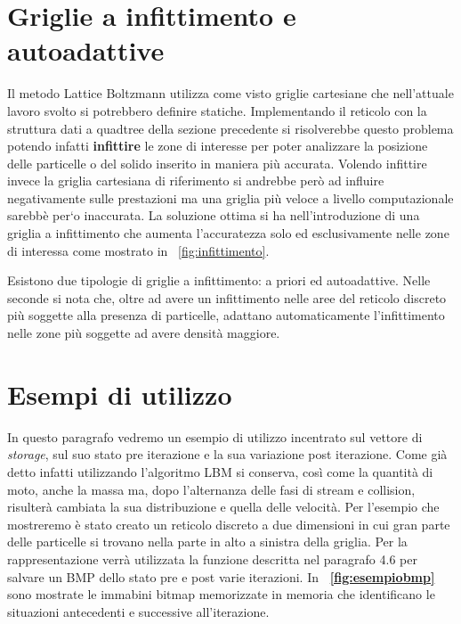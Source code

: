 \section{Griglie a infittimento e autoadattive}
Il metodo Lattice Boltzmann utilizza come visto griglie cartesiane che nell'attuale lavoro svolto si potrebbero definire statiche. Implementando il reticolo con la struttura dati a quadtree della sezione precedente si risolverebbe questo problema potendo infatti \textbf{infittire} le zone di interesse per poter analizzare la posizione delle particelle o del solido inserito in maniera pi\`u accurata. Volendo infittire invece la griglia cartesiana di riferimento si andrebbe per\`o ad influire negativamente sulle prestazioni ma una griglia pi\`u veloce a livello computazionale sarebb\`e per`o inaccurata. La soluzione ottima si ha nell'introduzione di una griglia a infittimento che aumenta l'accuratezza solo ed esclusivamente nelle zone di interessa come mostrato in \figurename~\ref{fig:infittimento}.


Esistono due tipologie di griglie a infittimento: a priori ed autoadattive. Nelle seconde si nota che, oltre ad avere un infittimento nelle aree del reticolo discreto pi\`u soggette alla presenza di particelle, adattano automaticamente l'infittimento nelle zone pi\`u soggette ad avere densit\`a maggiore.



\section{Esempi di utilizzo}
In questo paragrafo vedremo un esempio di utilizzo incentrato sul vettore di \textit{storage}, sul suo stato pre iterazione e la sua variazione post iterazione. Come gi\`a detto infatti utilizzando l'algoritmo LBM si conserva, cos\`i come la quantit\`a di moto, anche la massa ma, dopo l'alternanza delle fasi di stream e collision, risulter\`a cambiata la sua distribuzione e quella delle velocit\`a. Per l'esempio che mostreremo \`e stato creato un reticolo discreto a due dimensioni in cui gran parte delle particelle si trovano nella parte in alto a sinistra della griglia. Per la rappresentazione verr\`a utilizzata la funzione descritta nel paragrafo 4.6 per salvare un BMP dello stato pre e post varie iterazioni. In \textbf{\figurename~\ref{fig:esempiobmp}} sono mostrate le immabini bitmap memorizzate in memoria che identificano le situazioni antecedenti e successive all'iterazione.

